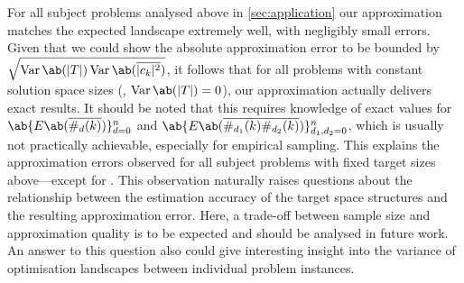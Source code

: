 For all subject problems analysed above in \cref{sec:application} 
our approximation matches the expected landscape extremely well, 
with negligibly small errors. Given that we could show the absolute 
approximation error to be bounded by $\sqrt{\Var\ab(|T|) 
\Var\ab(\overline{|c_k|^2})}$, it follows that for all problems with 
constant solution space sizes (\ie, $\Var\ab(|T|) = 0$), our 
approximation actually delivers exact results. It should be noted that this  
requires knowledge of exact values for 
$\ab\{E\ab(\overline{\#_d (k)})\}_{d=0}^n$ and $\ab\{E\ab(\overline{\#_{d_1} (k) \#_{d_2} (k)})\}_{d_1, d_2 = 0}^n$, 
which is usually not practically achievable, especially for 
empirical sampling. This explains the approximation errors observed 
for all subject problems with fixed target sizes above---except for \SAT. This 
observation naturally raises questions about the relationship 
between the estimation accuracy of the target space structures and 
the resulting approximation error. Here, a trade-off between sample 
size and approximation quality is to be expected and should be 
analysed in future work. An answer to this question also could give 
interesting insight into the variance of optimisation landscapes 
between individual problem instances.

